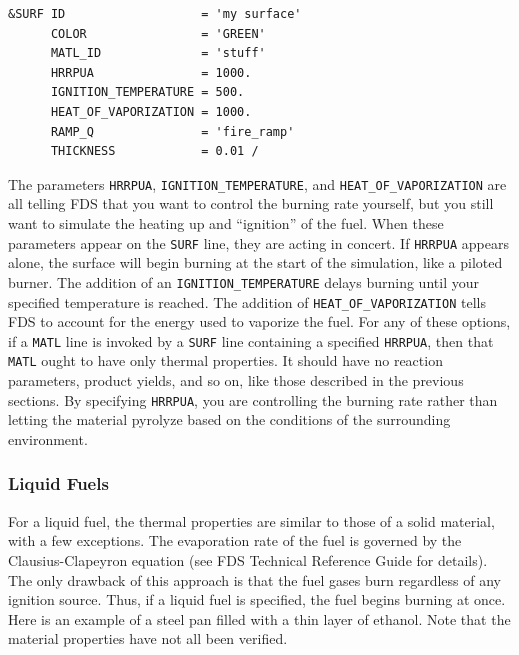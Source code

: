 \documentclass[11pt]{book}
\newcommand{\ct}{\tt\small}
\begin{document}
\footnotesize
\begin{verbatim}
&SURF ID                   = 'my surface'
      COLOR                = 'GREEN'
      MATL_ID              = 'stuff'
      HRRPUA               = 1000.
      IGNITION_TEMPERATURE = 500.
      HEAT_OF_VAPORIZATION = 1000.
      RAMP_Q               = 'fire_ramp'
      THICKNESS            = 0.01 /
\end{verbatim} \normalsize

\noindent
The parameters {\ct HRRPUA}, {\ct IGNITION\_TEMPERATURE}, and {\ct HEAT\_OF\_VAPORIZATION} are all telling FDS that you want to control the
burning rate yourself, but you still want to simulate the heating up and ``ignition'' of the fuel. When these parameters appear on the {\ct SURF} line, they
are acting in concert. If {\ct HRRPUA} appears alone, the surface will begin burning at the start of the simulation, like a piloted burner. The addition of
an {\ct IGNITION\_TEMPERATURE} delays burning until your specified temperature is reached. The addition of {\ct HEAT\_OF\_VAPORIZATION}
tells FDS to account for the energy used to vaporize the fuel. For any of these options, if a {\ct MATL} line is invoked by a {\ct SURF} line containing
a specified {\ct HRRPUA}, then that {\ct MATL} ought to have only thermal properties. It should have no reaction parameters, product yields, and so on, like
those described in the previous sections. By specifying {\ct HRRPUA}, you are controlling the burning rate rather than letting the material pyrolyze based on
the conditions of the surrounding environment.


\subsubsection{Liquid Fuels}

For a liquid fuel, the thermal properties are similar to those of a solid
material, with a few exceptions. The evaporation rate of the fuel
is governed by the Clausius-Clapeyron equation (see FDS Technical Reference
Guide for details). The only drawback of
this approach is that the fuel gases burn regardless of any ignition
source. Thus, if a liquid fuel is specified, the fuel
begins burning at once. Here is an example of a steel pan filled with a thin layer of ethanol. Note that the material
properties have not all been verified.
\end{document}
